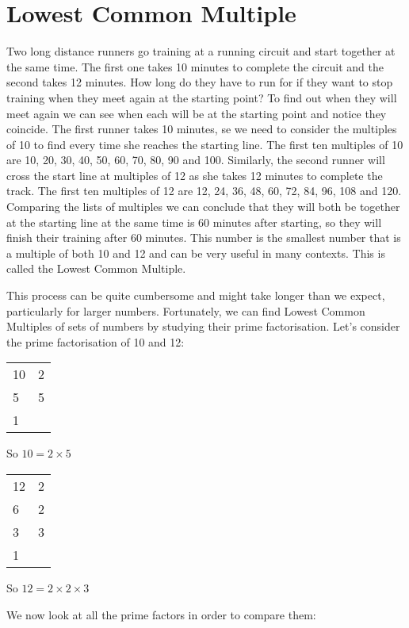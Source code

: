 \documentclass[11pt, oneside]{article}
\theoremstyle{definition}
\begin{document}
\section{Lowest Common Multiple}

Two long distance runners go training at a running circuit and start together at the same time. The first one takes 10 minutes to complete the circuit and the second takes 12 minutes. How long do they have to run for if they want to stop training when they meet again at the starting point? To find out when they will meet again we can see when each will be at the starting point and notice they coincide. The first runner takes 10 minutes, se we need to consider the multiples of 10 to find every time she reaches the starting line. The first ten multiples of 10 are 10, 20, 30, 40, 50, 60, 70, 80, 90 and 100. Similarly, the second runner will cross the start line at multiples of 12 as she takes 12 minutes to complete the track. The first ten multiples of 12 are 12, 24, 36, 48, 60, 72, 84, 96, 108 and 120. Comparing the lists of multiples we can conclude that they will both be together at the starting line at the same time is 60 minutes after starting, so they will finish their training after 60 minutes. This number is the smallest number that is a multiple of both 10 and 12 and can be very useful in many contexts. This is called the Lowest Common Multiple.

This process can be quite cumbersome and might take longer than we expect, particularly for larger numbers. Fortunately, we can find Lowest Common Multiples of sets of numbers by studying their prime factorisation. Let's consider the prime factorisation of 10 and 12:

\begin{tabular}{ p{0.5cm} | p{1.5cm}}
10 & 2  \\
5 & 5  \\
1 &  
\end{tabular}

So $10 = 2 \times 5$

\bigbreak

\begin{tabular}{ p{0.5cm} | p{1.5cm}}
12 & 2  \\
6 & 2  \\
3 & 3  \\
1 
\end{tabular}

So $12 = 2 \times 2 \times 3$

We now look at all the prime factors in order to compare them:
\end{document}
